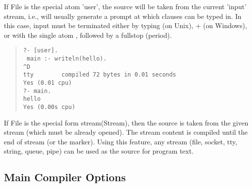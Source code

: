 If File is the special atom 'user', the source will be taken from
the current 'input' stream, i.e., will usually generate a prompt
at which clauses can be typed in.  In this case, input must be
terminated either by typing  (on Unix),
 + 
(on Windows), or with the single atom , followed by
a fullstop (period).
\begin{quote}
\begin{verbatim}
?- [user].
 main :- writeln(hello).
^D
tty        compiled 72 bytes in 0.01 seconds
Yes (0.01 cpu)
?- main.
hello
Yes (0.00s cpu)
\end{verbatim}
\end{quote}

If File is the special form stream(Stream), then the source is taken
from the given stream (which must be already opened).  The stream
content is compiled until the end of stream (or the 
marker).
Using this feature, any {\eclipse} stream (file, socket, tty, string,
queue, pipe) can be used as the source for program text.


\subsection{Main Compiler Options}

